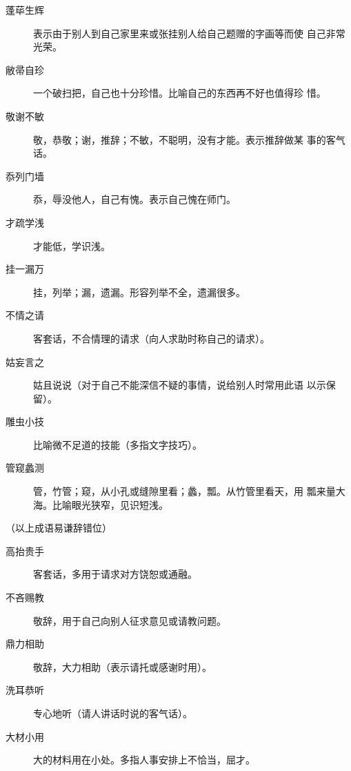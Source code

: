 \documentclass[final,oneside]{ctexbook}
\begin{document}
\begin{enumerate}
\begin{description}
      \item[蓬荜生辉] 表示由于别人到自己家里来或张挂别人给自己题赠的字画等而使
        自己非常光荣。

      \item[敝帚自珍] 一个破扫把，自己也十分珍惜。比喻自己的东西再不好也值得珍
        惜。

      \item[敬谢不敏] 敬，恭敬；谢，推辞；不敏，不聪明，没有才能。表示推辞做某
        事的客气话。

      \item[忝列门墙] 忝，辱没他人，自己有愧。表示自己愧在师门。

      \item[才疏学浅] 才能低，学识浅。

      \item[挂一漏万] 挂，列举；漏，遗漏。形容列举不全，遗漏很多。

      \item[不情之请] 客套话，不合情理的请求（向人求助时称自己的请求）。

      \item[姑妄言之] 姑且说说（对于自己不能深信不疑的事情，说给别人时常用此语
        以示保留）。

      \item[雕虫小技] 比喻微不足道的技能（多指文字技巧）。

      \item[管窥蠡测] 管，竹管；窥，从小孔或缝隙里看；蠡，瓢。从竹管里看天，用
        瓢来量大海。比喻眼光狭窄，见识短浅。

    \end{description}

    （以上成语易谦辞错位）

    \begin{description}

      \item[高抬贵手] 客套话，多用于请求对方饶恕或通融。

      \item[不吝赐教] 敬辞，用于自己向别人征求意见或请教问题。

      \item[鼎力相助] 敬辞，大力相助（表示请托或感谢时用）。

      \item[洗耳恭听] 专心地听（请人讲话时说的客气话）。

      \item[大材小用] 大的材料用在小处。多指人事安排上不恰当，屈才。


\end{description}
\end{enumerate}
\end{document}
